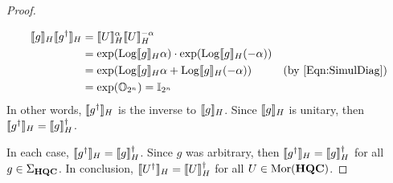 \begin{proof}
\begin{enumerate}
\begin{align*}
              \sem{g}_H \sem{g^\dagger}_H
              &=
              \sem{U}_H^\alpha \sem{U}_H^{-\alpha}
              \\
              &=
              \exp( \Log\sem{g}_H \alpha ) \cdot \exp( \Log\sem{g}_H (-\alpha) )
              \\
              &=
              \exp( \Log\sem{g}_H \alpha + \Log\sem{g}_H (-\alpha) )
              &
              ( \text{by~\cref{Eqn:SimulDiag}} )
              \\
              &=
              \exp( \mathbb{O}_{2^n} )
              =
              \mathbb{I}_{2^n}
          \end{align*}
          In other words, $\llbracket g^\dagger\rrbracket_H$ is the inverse to $\llbracket g\rrbracket_H$.
          Since $\llbracket g\rrbracket_H$ is unitary, then $\llbracket g^\dagger\rrbracket_H = \llbracket g\rrbracket_H^\dagger$.
    \end{enumerate}
    In each case, $\llbracket g^\dagger\rrbracket_H = \llbracket g\rrbracket_H^\dagger$.
    Since $g$ was arbitrary, then $\llbracket g^\dagger\rrbracket_H = \llbracket g\rrbracket_H^\dagger$ for all $g \in \Sigma_{\mathbf{HQC}}$.
    In conclusion, $\llbracket U^\dagger\rrbracket_H = \llbracket U\rrbracket_H^\dagger$ for all $U \in \operatorname{Mor}( \mathbf{HQC} )$.
\end{proof}
